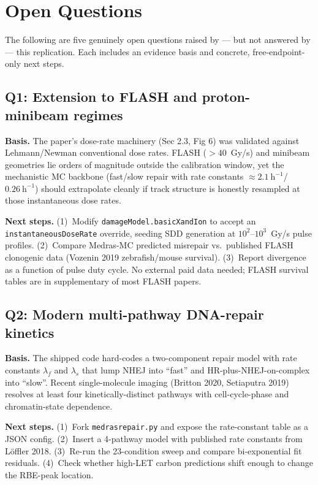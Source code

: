 \section{Open Questions}

The following are five genuinely open questions raised by --- but not answered
by --- this replication. Each includes an evidence basis and concrete,
free-endpoint-only next steps.

\subsection*{Q1: Extension to FLASH and proton-minibeam regimes}
\textbf{Basis.} The paper's dose-rate machinery (Sec 2.3, Fig 6) was
validated against Lehmann/Newman conventional dose rates. FLASH ($>40$~Gy/s)
and minibeam geometries lie orders of magnitude outside the calibration
window, yet the mechanistic MC backbone (fast/slow repair with rate
constants $\approx 2.1~\mathrm{h}^{-1}$/$0.26~\mathrm{h}^{-1}$) should
extrapolate cleanly if track structure is honestly resampled at those
instantaneous dose rates.

\textbf{Next steps.}
(1)~Modify \texttt{damageModel.basicXandIon} to accept an
\texttt{instantaneousDoseRate} override, seeding SDD generation at
$10^2$--$10^3$~Gy/s pulse profiles. (2)~Compare Medras-MC predicted misrepair
vs.\ published FLASH clonogenic data (Vozenin 2019 zebrafish/mouse
survival). (3)~Report divergence as a function of pulse duty cycle. No
external paid data needed; FLASH survival tables are in supplementary of
most FLASH papers.

\subsection*{Q2: Modern multi-pathway DNA-repair kinetics}
\textbf{Basis.} The shipped code hard-codes a two-component repair model
with rate constants $\lambda_f$ and $\lambda_s$ that lump NHEJ into
``fast'' and HR-plus-NHEJ-on-complex into ``slow''. Recent single-molecule
imaging (Britton 2020, Setiaputra 2019) resolves at least four
kinetically-distinct pathways with cell-cycle-phase and chromatin-state
dependence.

\textbf{Next steps.}
(1)~Fork \texttt{medrasrepair.py} and expose the rate-constant table as a
JSON config. (2)~Insert a 4-pathway model with published rate constants
from L\"offler 2018. (3)~Re-run the 23-condition sweep and compare
bi-exponential fit residuals. (4)~Check whether high-LET carbon predictions
shift enough to change the RBE-peak location.

